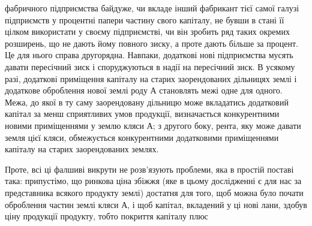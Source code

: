 фабричного підприємства байдуже, чи вкладе інший фабрикант тієї
самої галузі підприємств у процентні папери частину свого капіталу, не бувши в
стані її цілком використати у своєму підприємстві, чи він зробить ряд таких окремих
розширень, що не дають йому повного зиску, а проте дають більше за процент.
Це для нього справа другорядна. Навпаки, додаткові нові підприємства мусять
давати пересічний зиск і споруджуються в надії на пересічний зиск. В усякому
разі, додаткові приміщення капіталу на старих заорендованих дільницях
землі і додаткове оброблення нової землі роду А становлять межі одне для одного.
Межа, до якої в ту саму заорендовану дільницю може вкладатись додатковий
капітал за менш сприятливих умов продукції, визначається конкурентними
новими приміщеннями у землю кляси А; з другого боку, рента, яку
може давати земля цієї кляси, обмежується конкурентними додатковими приміщеннями
капіталу на старих заорендованих землях.

Проте, всі ці фалшиві викрути не розв’язують проблеми, яка в простій
поставі така: припустімо, що ринкова ціна збіжжя (яке в цьому дослідженні
є для нас за представника всякого продукту землі) достатня для того, щоб
можна було почати оброблення частин землі кляси А, і щоб капітал, вкладений
у ці нові лани, здобув ціну продукції продукту, тобто покриття капіталу плюс
